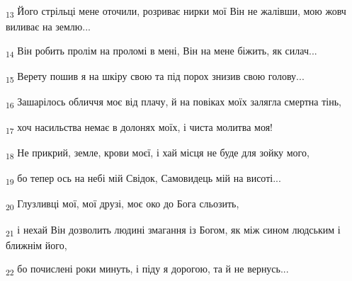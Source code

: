 \begin{tcolorbox}
\textsubscript{13} Його стрільці мене оточили, розриває нирки мої Він не жалівши, мою жовч виливає на землю...
\end{tcolorbox}
\begin{tcolorbox}
\textsubscript{14} Він робить пролім на проломі в мені, Він на мене біжить, як силач...
\end{tcolorbox}
\begin{tcolorbox}
\textsubscript{15} Верету пошив я на шкіру свою та під порох знизив свою голову...
\end{tcolorbox}
\begin{tcolorbox}
\textsubscript{16} Зашарілось обличчя моє від плачу, й на повіках моїх залягла смертна тінь,
\end{tcolorbox}
\begin{tcolorbox}
\textsubscript{17} хоч насильства немає в долонях моїх, і чиста молитва моя!
\end{tcolorbox}
\begin{tcolorbox}
\textsubscript{18} Не прикрий, земле, крови моєї, і хай місця не буде для зойку мого,
\end{tcolorbox}
\begin{tcolorbox}
\textsubscript{19} бо тепер ось на небі мій Свідок, Самовидець мій на висоті...
\end{tcolorbox}
\begin{tcolorbox}
\textsubscript{20} Глузливці мої, мої друзі, моє око до Бога сльозить,
\end{tcolorbox}
\begin{tcolorbox}
\textsubscript{21} і нехай Він дозволить людині змагання із Богом, як між сином людським і ближнім його,
\end{tcolorbox}
\begin{tcolorbox}
\textsubscript{22} бо почислені роки минуть, і піду я дорогою, та й не вернусь...
\end{tcolorbox}

